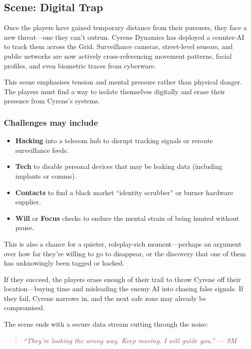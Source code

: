 \subsection*{Scene: Digital Trap}

Once the players have gained temporary distance from their pursuers, they face a new threat—one they can’t outrun. Cyrene Dynamics has deployed a counter-AI to track them across the Grid. Surveillance cameras, street-level sensors, and public networks are now actively cross-referencing movement patterns, facial profiles, and even biometric traces from cyberware.

This scene emphasises tension and mental pressure rather than physical danger. The players must find a way to isolate themselves digitally and erase their presence from Cyrene’s systems.

\subsubsection{Challenges may include}
\begin{itemize}
    \item \textbf{Hacking} into a telecom hub to disrupt tracking signals or reroute surveillance feeds.
    \item \textbf{Tech} to disable personal devices that may be leaking data (including implants or comms).
    \item \textbf{Contacts} to find a black market “identity scrubber” or burner hardware supplier.
    \item \textbf{Will} or \textbf{Focus} checks to endure the mental strain of being hunted without pause.
\end{itemize}

This is also a chance for a quieter, roleplay-rich moment—perhaps an argument over how far they’re willing to go to disappear, or the discovery that one of them has unknowingly been tagged or hacked.

If they succeed, the players erase enough of their trail to throw Cyrene off their location—buying time and misleading the enemy AI into chasing false signals. If they fail, Cyrene narrows in, and the next safe zone may already be compromised.

The scene ends with a secure data stream cutting through the noise:

\vspace{0.5\baselineskip}
\begin{quote}
\textit{“They’re looking the wrong way. Keep moving. I will guide you.” — SM}
\end{quote}
\vspace{0.5\baselineskip}

